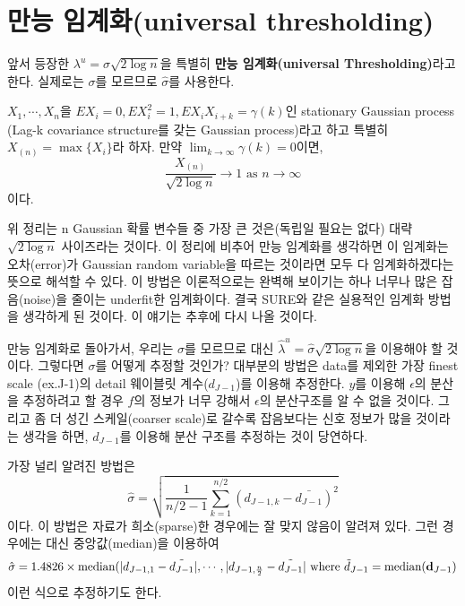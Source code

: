 \documentclass[b5paper,]{scrbook}
\theoremstyle{plain}
\theoremstyle{definition}
\numberwithin{equation}{section}
\let\BeginKnitrBlock\begin \let\EndKnitrBlock\end
\begin{document}
\hypertarget{-universal-thresholding}{%
\section{만능 임계화(universal thresholding)}\label{-universal-thresholding}}

앞서 등장한 \(\lambda^{u}=\sigma \sqrt{2 \log n}\)을 특별히 \textbf{만능 임계화(universal Thresholding)}라고 한다. 실제로는 \(\sigma\)를 모르므로 \(\hat{\sigma}\)를 사용한다.

\BeginKnitrBlock{theorem}[만능 임계화]
\protect\hypertarget{thm:unnamed-chunk-309}{}{\label{thm:unnamed-chunk-309} {} }\(X_{1},\cdots , X_{n}\)을 \(EX_{i}=0, EX_{i}^{2}=1, EX_{i}X_{i+k}=\gamma(k)\)인 stationary Gaussian process (Lag-k covariance structure를 갖는 Gaussian process)라고 하고 특별히 \(X_{(n)}=\max \{ X_{i} \}\)라 하자. 만약 \(\lim_{k \rightarrow \infty} \gamma (k) =0\)이면,
\[\frac{X_{(n)}}{\sqrt{2 \log n}} \rightarrow 1 \text{ as } n \rightarrow \infty\]
이다.
\EndKnitrBlock{theorem}

위 정리는 n Gaussian 확률 변수들 중 가장 큰 것은(독립일 필요는 없다) 대략 \(\sqrt{2 \log n}\) 사이즈라는 것이다. 이 정리에 비추어 만능 임계화를 생각하면 이 임계화는 오차(error)가 Gaussian random variable을 따르는 것이라면 모두 다 임계화하겠다는 뜻으로 해석할 수 있다. 이 방법은 이론적으로는 완벽해 보이기는 하나 너무나 많은 잡음(noise)을 줄이는 underfit한 임계화이다. 결국 SURE와 같은 실용적인 임계화 방법을 생각하게 된 것이다. 이 얘기는 추후에 다시 나올 것이다.

만능 임계화로 돌아가서, 우리는 \(\sigma\)를 모르므로 대신 \(\hat{\lambda}^{u}=\hat{\sigma}\sqrt{2 \log n}\)을 이용해야 할 것이다. 그렇다면 \(\sigma\)를 어떻게 추정할 것인가? 대부분의 방법은 data를 제외한 가장 finest scale (ex.J-1)의 detail 웨이블릿 계수(\(d_{J-1}\))를 이용해 추정한다. \(y\)를 이용해 \(\epsilon\)의 분산을 추정하려고 할 경우 \(f\)의 정보가 너무 강해서 \(\epsilon\)의 분산구조를 알 수 없을 것이다. 그리고 좀 더 성긴 스케일(coarser scale)로 갈수록 잡음보다는 신호 정보가 많을 것이라는 생각을 하면, \(d_{J-1}\)를 이용해 분산 구조를 추정하는 것이 당연하다.

가장 널리 알려진 방법은
\[\hat{\sigma}=\sqrt{\frac{1}{n/2-1}\sum_{k=1}^{n/2}(d_{J-1,k}-\bar{d_{J-1}})^{2}}\]
이다. 이 방법은 자료가 희소(sparse)한 경우에는 잘 맞지 않음이 알려져 있다. 그런 경우에는 대신 중앙값(median)을 이용하여
\[
\hat{\sigma}=1.4826 \times \text{median}(|d_{J-1,1}-\tilde{d_{J-1}}|,\cdots,|d_{J-1,\frac{n}{2}}-\tilde{d_{J-1}}|\\
\text{ where } \tilde{d}_{J-1}=\text{median}(\mathbf{d}_{J-1})
\]
이런 식으로 추정하기도 한다.
\end{document}
